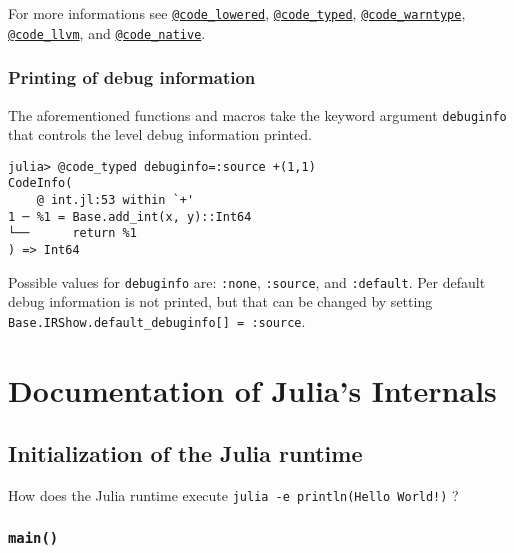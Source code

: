 For more informations see \hyperlink{1376948972689074219}{\texttt{@code\_lowered}}, \hyperlink{6823997547688846780}{\texttt{@code\_typed}}, \hyperlink{8092893264277772840}{\texttt{@code\_warntype}}, \hyperlink{18039596607712979441}{\texttt{@code\_llvm}}, and \hyperlink{2629340111434042067}{\texttt{@code\_native}}.



\hypertarget{4254640328057635583}{}


\subsection{Printing of debug information}



The aforementioned functions and macros take the keyword argument \texttt{debuginfo} that controls the level debug information printed.




\begin{verbatim}
julia> @code_typed debuginfo=:source +(1,1)
CodeInfo(
    @ int.jl:53 within `+'
1 ─ %1 = Base.add_int(x, y)::Int64
└──      return %1
) => Int64
\end{verbatim}



Possible values for \texttt{debuginfo} are: \texttt{:none}, \texttt{:source}, and \texttt{:default}. Per default debug information is not printed, but that can be changed by setting \texttt{Base.IRShow.default\_debuginfo[] = :source}.



\chapter{Documentation of Julia's Internals}


\hypertarget{14839170566260018486}{}


\section{Initialization of the Julia runtime}



How does the Julia runtime execute \texttt{julia -e {\textquotesingle}println({\textquotedbl}Hello World!{\textquotedbl}){\textquotesingle}} ?



\hypertarget{6651980781302015874}{}


\subsection{\texttt{main()}}



